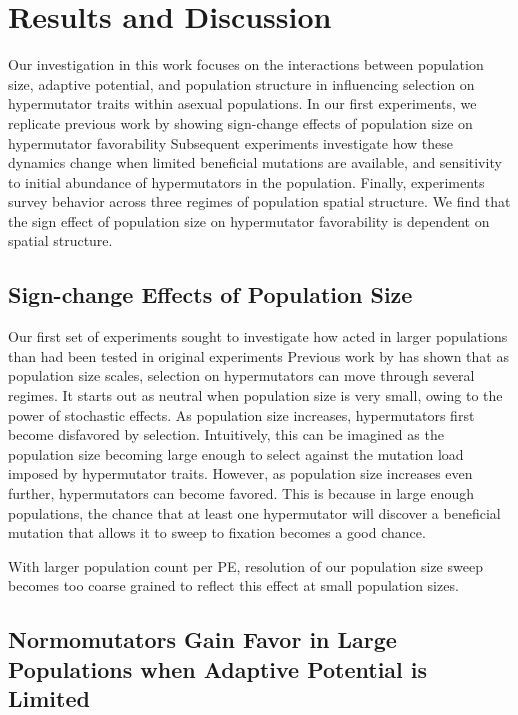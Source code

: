\section{Results and Discussion} \label{sec:results}

Our investigation in this work focuses on the interactions between population size, adaptive potential, and population structure in influencing selection on hypermutator traits within asexual populations.
In our first experiments, we replicate previous work by \citet{raynes2018sign} showing sign-change effects of population size on hypermutator favorability
Subsequent experiments investigate how these dynamics change when limited beneficial mutations are available, and sensitivity to initial abundance of hypermutators in the population.
Finally, experiments survey behavior across three regimes of population spatial structure.
We find that the sign effect of population size on hypermutator favorability is dependent on spatial structure.

\subsection{Sign-change Effects of Population Size}

Our first set of experiments sought to investigate how acted in larger populations than had been tested in original experiments
Previous work by \citet{raynes2018sign} has shown that as population size scales, selection on hypermutators can move through several regimes.
It starts out as neutral when population size is very small, owing to the power of stochastic effects.
As population size increases, hypermutators first become disfavored by selection.
Intuitively, this can be imagined as the population size becoming large enough to select against the mutation load imposed by hypermutator traits.
However, as population size increases even further, hypermutators can become favored.
This is because in large enough populations, the chance that at least one hypermutator will discover a beneficial mutation that allows it to sweep to fixation becomes a good chance.

With larger population count per PE, resolution of our population size sweep becomes too coarse grained to reflect this effect at small population sizes.



\subsection{Normomutators Gain Favor in Large Populations when Adaptive Potential is Limited}

